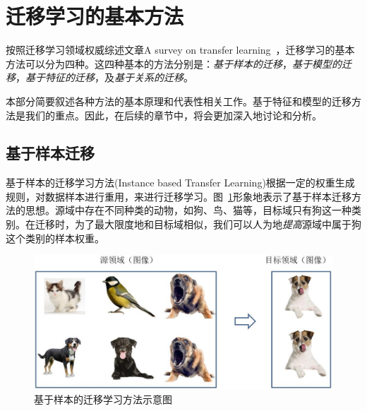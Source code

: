 \newpage
\section{迁移学习的基本方法} \label{whytransfer}

按照迁移学习领域权威综述文章A survey on transfer learning~\cite{pan2010survey}，迁移学习的基本方法可以分为四种。这四种基本的方法分别是：\textit{基于样本的迁移}，\textit{基于模型的迁移}，\textit{基于特征的迁移}，及\textit{基于关系的迁移}。

本部分简要叙述各种方法的基本原理和代表性相关工作。基于特征和模型的迁移方法是我们的重点。因此，在后续的章节中，将会更加深入地讨论和分析。

\subsection{基于样本迁移}

基于样本的迁移学习方法(Instance based Transfer Learning)根据一定的权重生成规则，对数据样本进行重用，来进行迁移学习。图~\ref{fig-method-instance}形象地表示了基于样本迁移方法的思想。源域中存在不同种类的动物，如狗、鸟、猫等，目标域只有狗这一种类别。在迁移时，为了最大限度地和目标域相似，我们可以人为地\textit{提高}源域中属于狗这个类别的样本权重。

\begin{figure}[htbp]
	\centering
	\includegraphics[scale=0.4]{./figures/fig-method-instance.pdf}
	\caption{基于样本的迁移学习方法示意图}
	\label{fig-method-instance}
\end{figure}


